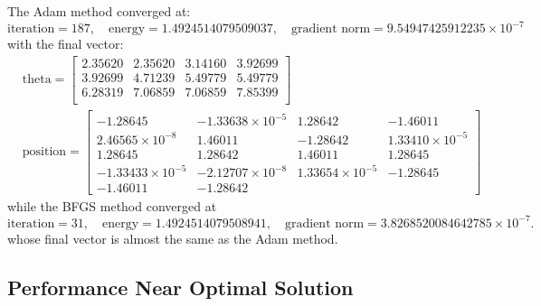 \documentclass[12pt]{article}
\newcommand{\0}{\boldsymbol{0}}
\begin{document}
The Adam method converged at:
\[
    \text{iteration}= 187,\quad	\text{energy} = 1.4924514079509037,\quad	\text{gradient norm} = 9.54947425912235\times 10^{-7}
\]
with the final vector:
\begin{align*}
    &\text{theta} = \begin{bmatrix}
        2.35620 & 2.35620 & 3.14160 & 3.92699 \\
        3.92699 & 4.71239 & 5.49779 & 5.49779 \\
        6.28319 & 7.06859 & 7.06859 & 7.85399 \\
    \end{bmatrix}
    \\
    &\text{position} = \begin{bmatrix}
        -1.28645 & -1.33638\times 10^{-5} &  1.28642 & -1.46011 \\
        2.46565\times 10^{-8} &  1.46011 & -1.28642 &  1.33410\times 10^{-5} \\
        1.28645 &  1.28642 &  1.46011 &  1.28645 \\
       -1.33433\times 10^{-5} & -2.12707\times 10^{-8} &  1.33654\times 10^{-5} & -1.28645 \\
       -1.46011 & -1.28642 & & 
    \end{bmatrix}
\end{align*}
while the BFGS method converged at
\[
    \text{iteration}= 31,\quad	\text{energy} = 1.4924514079508941,\quad	\text{gradient norm} = 3.8268520084642785\times 10^{-7}.
\]
whose final vector is almost the same as the Adam method.

\subsection{Performance Near Optimal Solution}
\end{document}
